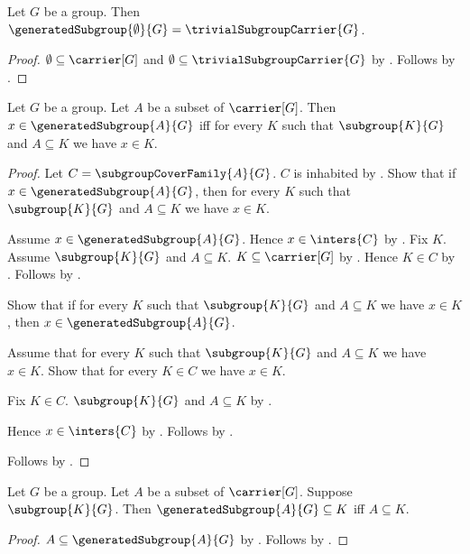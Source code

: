 \begin{corollary}\label{generated_subgroup_emptyset}
    Let $G$ be a group.
    Then
        $\generatedSubgroup{\emptyset}{G}=
            \trivialSubgroupCarrier{G}$.
\end{corollary}
\begin{proof}
    $\emptyset\subseteq\carrier[G]$ and
        $\emptyset\subseteq\trivialSubgroupCarrier{G}$ by
        .
    Follows by .
\end{proof}

\begin{theorem}\label{generated_subgroup_iff}
    Let $G$ be a group.
    Let $A$ be a subset of $\carrier[G]$.
    Then $x\in\generatedSubgroup{A}{G}$ iff for every $K$ such that
        $\subgroup{K}{G}$ and $A\subseteq K$ we have $x\in K$.
\end{theorem}
\begin{proof}
    Let $C=\subgroupCoverFamily{A}{G}$.
    $C$ is inhabited by .
    Show that if $x\in\generatedSubgroup{A}{G}$, then for every $K$ such that
        $\subgroup{K}{G}$ and $A\subseteq K$ we have $x\in K$.
    \begin{subproof}
        Assume $x\in\generatedSubgroup{A}{G}$.
        Hence $x\in\inters{C}$ by .
        Fix $K$.
        Assume $\subgroup{K}{G}$ and $A\subseteq K$.
        $K\subseteq\carrier[G]$ by .
        Hence $K\in C$ by .
        Follows by .
    \end{subproof}
    Show that if for every $K$ such that
        $\subgroup{K}{G}$ and $A\subseteq K$ we have $x\in K$, then
        $x\in\generatedSubgroup{A}{G}$.
    \begin{subproof}
        Assume that for every $K$ such that
            $\subgroup{K}{G}$ and $A\subseteq K$ we have $x\in K$.
        Show that for every $K\in C$ we have $x\in K$.
        \begin{subproof}
            Fix $K\in C$.
            $\subgroup{K}{G}$ and $A\subseteq K$ by
                .
        \end{subproof}
        Hence $x\in\inters{C}$ by .
        Follows by .
    \end{subproof}
    Follows by \auto.
\end{proof}

\begin{theorem}\label{generated_subgroup_universal_property}
    Let $G$ be a group.
    Let $A$ be a subset of $\carrier[G]$.
    Suppose $\subgroup{K}{G}$.
    Then $\generatedSubgroup{A}{G}\subseteq K$ iff $A\subseteq K$.
\end{theorem}
\begin{proof}
    $A\subseteq\generatedSubgroup{A}{G}$ by
        .
    Follows by .
\end{proof}


